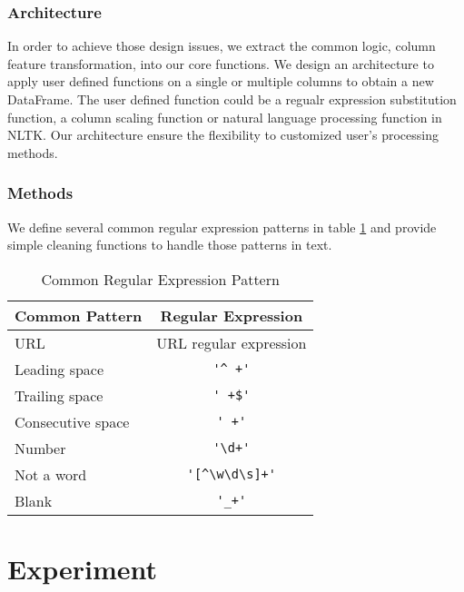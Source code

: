 \documentclass[sigconf]{acmart}
\begin{document}
\subsubsection{Architecture}
In order to achieve those design issues, we extract the common logic, column feature transformation, into our core functions. We design an architecture to apply user defined functions on a single or multiple columns to obtain a new DataFrame. The user defined function could be a regualr expression substitution function, a column scaling function or natural language processing function in NLTK. Our architecture ensure the flexibility to customized user's processing methods.

\subsubsection{Methods}
We define several common regular expression patterns in table \ref{tab:reg} and provide simple cleaning functions to handle those patterns in text.
\begin{table}
\caption{Common Regular Expression Pattern}   
\label{tab:reg}
\begin{tabular}{lc}
	Common Pattern & Regular Expression \\
\hline
	URL & URL regular expression\cite{url} \\
	Leading space & \verb!'^ +'! \\
	Trailing space & \verb!' +$'! \\
	Consecutive space & \verb!' +'! \\
	Number & \verb!'\d+'!  \\
	Not a word & \verb!'[^\w\d\s]+'! \\
	Blank & \verb!'_+'!
\end{tabular}   
\end{table}


\section{Experiment}
\end{document}
